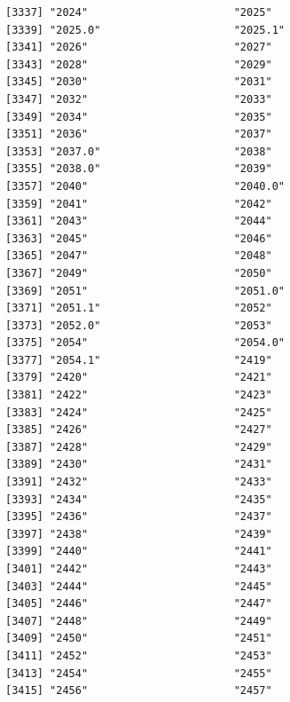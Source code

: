 \documentclass[
  letterpaper,
  DIV=11,
  numbers=noendperiod]{scrreprt}
\begin{document}
\begin{verbatim}
[3337] "2024"                       "2025"                      
[3339] "2025.0"                     "2025.1"                    
[3341] "2026"                       "2027"                      
[3343] "2028"                       "2029"                      
[3345] "2030"                       "2031"                      
[3347] "2032"                       "2033"                      
[3349] "2034"                       "2035"                      
[3351] "2036"                       "2037"                      
[3353] "2037.0"                     "2038"                      
[3355] "2038.0"                     "2039"                      
[3357] "2040"                       "2040.0"                    
[3359] "2041"                       "2042"                      
[3361] "2043"                       "2044"                      
[3363] "2045"                       "2046"                      
[3365] "2047"                       "2048"                      
[3367] "2049"                       "2050"                      
[3369] "2051"                       "2051.0"                    
[3371] "2051.1"                     "2052"                      
[3373] "2052.0"                     "2053"                      
[3375] "2054"                       "2054.0"                    
[3377] "2054.1"                     "2419"                      
[3379] "2420"                       "2421"                      
[3381] "2422"                       "2423"                      
[3383] "2424"                       "2425"                      
[3385] "2426"                       "2427"                      
[3387] "2428"                       "2429"                      
[3389] "2430"                       "2431"                      
[3391] "2432"                       "2433"                      
[3393] "2434"                       "2435"                      
[3395] "2436"                       "2437"                      
[3397] "2438"                       "2439"                      
[3399] "2440"                       "2441"                      
[3401] "2442"                       "2443"                      
[3403] "2444"                       "2445"                      
[3405] "2446"                       "2447"                      
[3407] "2448"                       "2449"                      
[3409] "2450"                       "2451"                      
[3411] "2452"                       "2453"                      
[3413] "2454"                       "2455"                      
[3415] "2456"                       "2457"                      

\end{verbatim}
\end{document}
